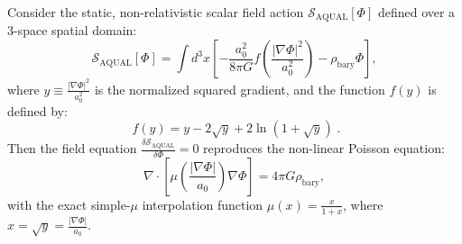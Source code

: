 \documentclass[11pt,a4paper]{article}
\theoremstyle{definition}
\begin{document}
\begin{theorem}
\label{thm:aqual_action}
Consider the static, non-relativistic scalar field action $\mathcal{S}_{\text{AQUAL}}[\Phi]$ defined over a 3-space spatial domain:
\begin{equation}
\mathcal{S}_{\text{AQUAL}}[\Phi] = \int d^3x \left[ -\frac{a_0^2}{8\pi G} f\left( \frac{|\nabla\Phi|^2}{a_0^2} \right) - \rho_{\text{bary}} \Phi \right],
\end{equation}
where $y \equiv \frac{|\nabla\Phi|^2}{a_0^2}$ is the normalized squared gradient, and the function $f(y)$ is defined by:
\begin{equation}
\boxed{\;f(y) = y - 2\sqrt{y} + 2\ln\left(1 + \sqrt{y}\right)\;}.
\label{eq:f_y_definition}
\end{equation}
Then the field equation $\frac{\delta \mathcal{S}_{\text{AQUAL}}}{\delta \Phi} = 0$ reproduces the non-linear Poisson equation:
\begin{equation}
\nabla \cdot \left[ \mu\left( \frac{|\nabla\Phi|}{a_0} \right) \nabla\Phi \right] = 4\pi G \rho_{\text{bary}},
\end{equation}
with the exact simple-$\mu$ interpolation function $\mu(x) = \frac{x}{1+x}$, where $x = \sqrt{y} = \frac{|\nabla\Phi|}{a_0}$.
\end{theorem}
\end{document}
